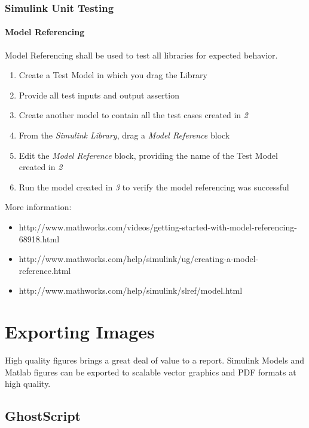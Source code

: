 \documentclass[]{book}
\providecommand{\tightlist}{%
  \setlength{\itemsep}{0pt}\setlength{\parskip}{0pt}}
\let\oldparagraph\paragraph
\renewcommand{\paragraph}[1]{\oldparagraph{#1}\mbox{}}
\begin{document}
\subsubsection{Simulink Unit Testing}\label{simulink-unit-testing}

\paragraph{Model Referencing}\label{model-referencing}

Model Referencing shall be used to test all libraries for expected
behavior.

\begin{enumerate}
\def\labelenumi{\arabic{enumi}.}
\tightlist
\item
  Create a Test Model in which you drag the Library
\item
  Provide all test inputs and output assertion
\item
  Create another model to contain all the test cases created in \emph{2}
\item
  From the \emph{Simulink Library}, drag a \emph{Model Reference} block
\item
  Edit the \emph{Model Reference} block, providing the name of the Test
  Model created in \emph{2}
\item
  Run the model created in \emph{3} to verify the model referencing was
  successful
\end{enumerate}

More information:

\begin{itemize}
\tightlist
\item
  http://www.mathworks.com/videos/getting-started-with-model-referencing-68918.html
\item
  http://www.mathworks.com/help/simulink/ug/creating-a-model-reference.html
\item
  http://www.mathworks.com/help/simulink/slref/model.html
\end{itemize}

\section{Exporting Images}\label{exporting-images}

High quality figures brings a great deal of value to a report. Simulink
Models and Matlab figures can be exported to scalable vector graphics
and PDF formats at high quality.

\subsection{GhostScript}\label{ghostscript}
\end{document}
